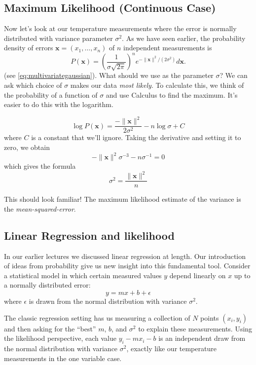 \documentclass[
  oneside]{scrbook}
\begin{document}
\hypertarget{maximum-likelihood-continuous-case}{%
\subsection{Maximum Likelihood (Continuous
Case)}\label{maximum-likelihood-continuous-case}}

Now let's look at our temperature measurements where the error is
normally distributed with variance parameter \(\sigma^2\). As we have
seen earlier, the probability density of errors
\(\mathbf{x}=(x_1,\ldots,x_n)\) of \(n\) independent measurements is \[
P(\mathbf{x}) = \left(\frac{1}{\sigma\sqrt{2\pi}}\right)^{n}e^{-\|\mathbf{x}\|^2/(2\sigma^2)}d\mathbf{x}.
\] (see \cref{eq:multivariategaussian}). What should we use as the
parameter \(\sigma\)? We can ask which choice of \(\sigma\) makes our
data \emph{most likely}. To calculate this, we think of the probability
of a function of \(\sigma\) and use Calculus to find the maximum. It's
easier to do this with the logarithm.

\[
\log P(\mathbf{x})=\frac{-\|\mathbf{x}\|^2}{2\sigma^2}-n\log{\sigma}+C
\] where \(C\) is a constant that we'll ignore. Taking the derivative
and setting it to zero, we obtain \[
-\|\mathbf{x}\|^2\sigma^{-3}-n\sigma^{-1}=0
\] which gives the formula \[
\sigma^2=\frac{\|\mathbf{x}\|^2}{n}
\]

This should look familiar! The maximum likelihood estimate of the
variance is the \emph{mean-squared-error}.

\hypertarget{linear-regression-and-likelihood}{%
\subsection{Linear Regression and
likelihood}\label{linear-regression-and-likelihood}}

In our earlier lectures we discussed linear regression at length. Our
introduction of ideas from probability give us new insight into this
fundamental tool. Consider a statistical model in which certain measured
values \(y\) depend linearly on \(x\) up to a normally distributed
error: \[
y=mx+b+\epsilon
\] where \(\epsilon\) is drawn from the normal distribution with
variance \(\sigma^2\).

The classic regression setting has us measuring a collection of \(N\)
points \((x_i,y_i)\) and then asking for the ``best'' \(m\), \(b\), and
\(\sigma^2\) to explain these measurements. Using the likelihood
perspective, each value \(y_i-mx_i-b\) is an independent draw from the
normal distribution with variance \(\sigma^2\), exactly like our
temperature measurements in the one variable case.
\end{document}
